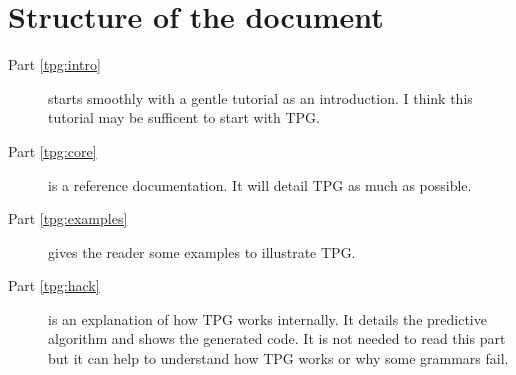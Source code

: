 \section{Structure of the document}

\begin{description}
\item [Part \ref{tpg:intro}]
starts smoothly with a gentle tutorial as an introduction.
I think this tutorial may be sufficent to start with TPG.
\item [Part \ref{tpg:core}]
is a reference documentation. It will detail TPG as much as possible.
\item [Part \ref{tpg:examples}]
gives the reader some examples to illustrate TPG.
\item [Part \ref{tpg:hack}]
is an explanation of how TPG works internally. It details the predictive algorithm and shows the generated code. It is not needed to read this part but it can help to understand how TPG works or why some grammars fail.
\end{description}
